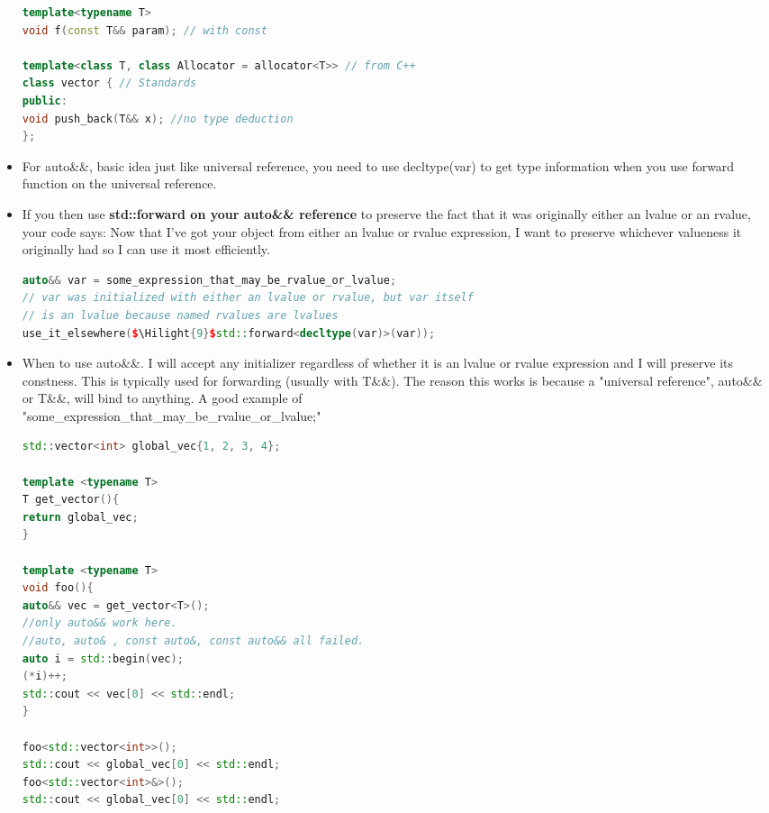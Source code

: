 \documentclass[a4paper,11pt,twoside]{book}
\newcommand{\Hilight}[1]{\makebox[0pt][l]{\color{yellow}\rule[-3pt]{#1em}{11pt}}}
\newcommand{\Hilight}[1]{}
\begin{document}
\begin{itemize}
\begin{lstlisting}[frame=single, language=c++, mathescape=true]
template<typename T>
void f(const T&& param); // with const

template<class T, class Allocator = allocator<T>> // from C++
class vector { // Standards
public:
void push_back(T&& x); //no type deduction
};
\end{lstlisting}


\item For auto\&\&, basic idea just like universal reference, you need to use decltype(var) to get type information when you use forward function on the universal reference. 

\item If you then use \textbf{std::forward on your auto\&\& reference} to preserve the fact that it was originally either an lvalue or an rvalue, your code says: Now that I've got your object from either an lvalue or rvalue expression, I want to preserve whichever valueness it originally had so I can use it most efficiently.

\begin{lstlisting}[frame=single, language=c++]
auto&& var = some_expression_that_may_be_rvalue_or_lvalue;
// var was initialized with either an lvalue or rvalue, but var itself
// is an lvalue because named rvalues are lvalues
use_it_elsewhere($\Hilight{9}$std::forward<decltype(var)>(var));
\end{lstlisting}

\item When to use auto\&\&. I will accept any initializer regardless of whether it is an lvalue or rvalue expression and I will preserve its constness. This is typically used for forwarding (usually with T\&\&). The reason this works is because a "universal reference", auto\&\& or T\&\&, will bind to anything. A good example of\\
"some\_expression\_that\_may\_be\_rvalue\_or\_lvalue;"
\begin{lstlisting}[frame=single, language=c++]
std::vector<int> global_vec{1, 2, 3, 4};

template <typename T>
T get_vector(){
return global_vec;
}

template <typename T>
void foo(){
auto&& vec = get_vector<T>(); 
//only auto&& work here. 
//auto, auto& , const auto&, const auto&& all failed.
auto i = std::begin(vec);
(*i)++;
std::cout << vec[0] << std::endl;
}

foo<std::vector<int>>();
std::cout << global_vec[0] << std::endl;
foo<std::vector<int>&>();
std::cout << global_vec[0] << std::endl;

\end{lstlisting}

\end{itemize}
\end{document}
